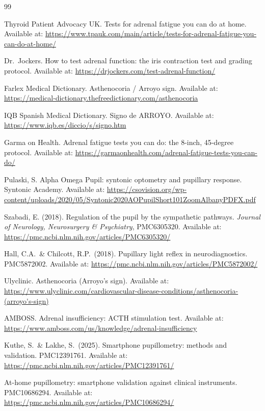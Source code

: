 \documentclass[11pt]{article}
\begin{document}
\begin{thebibliography}{99}
\begingroup\sloppy

 Thyroid Patient Advocacy UK. Tests for adrenal fatigue you can
  do at home. Available at:
  \url{https://www.tpauk.com/main/article/tests-for-adrenal-fatigue-you-can-do-at-home/}

 Dr.\ Jockers. How to test adrenal function: the iris
  contraction test and grading protocol. Available at:
  \url{https://drjockers.com/test-adrenal-function/}

 Farlex Medical Dictionary. Asthenocoria / Arroyo sign.
  Available at:
  \url{https://medical-dictionary.thefreedictionary.com/asthenocoria}

 IQB Spanish Medical Dictionary. Signo de ARROYO. Available at:
  \url{https://www.iqb.es/diccio/s/signo.htm}

 Garma on Health. Adrenal fatigue tests you can do: the
  8-inch, 45-degree protocol. Available at:
  \url{https://garmaonhealth.com/adrenal-fatigue-tests-you-can-do/}

 Pulaski, S. Alpha Omega Pupil: syntonic optometry and
  pupillary response. Syntonic Academy. Available at:
  \url{https://csovision.org/wp-content/uploads/2020/05/Syntonic2020AOPupilShort101ZoomAlbanyPDFX.pdf}

 Szabadi, E. (2018). Regulation of the pupil by the
  sympathetic pathways. \textit{Journal of Neurology, Neurosurgery \&
  Psychiatry}, PMC6305320. Available at:
  \url{https://pmc.ncbi.nlm.nih.gov/articles/PMC6305320/}

 Hall, C.A.\ \& Chilcott, R.P.\ (2018). Pupillary light reflex
  in neurodiagnostics. PMC5872002. Available at:
  \url{https://pmc.ncbi.nlm.nih.gov/articles/PMC5872002/}

 Ulyclinic. Asthenocoria (Arroyo's sign). Available at:
  \url{https://www.ulyclinic.com/cardiovascular-disease-conditions/asthenocoria-(arroyo's-sign)}

 AMBOSS. Adrenal insufficiency: ACTH stimulation test.
  Available at: \url{https://www.amboss.com/us/knowledge/adrenal-insufficiency}

 Kuthe, S.\ \& Lakhe, S.\ (2025). Smartphone pupillometry:
  methods and validation. PMC12391761. Available at:
  \url{https://pmc.ncbi.nlm.nih.gov/articles/PMC12391761/}

 At-home pupillometry: smartphone validation against
  clinical instruments. PMC10686294. Available at:
  \url{https://pmc.ncbi.nlm.nih.gov/articles/PMC10686294/}


\end{thebibliography}
\end{document}
